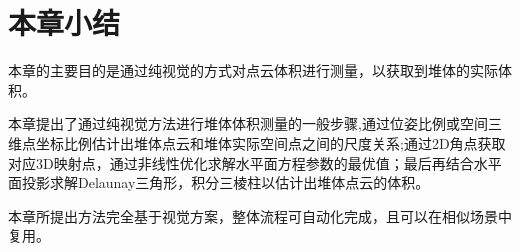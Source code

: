 \section{本章小结}
本章的主要目的是通过纯视觉的方式对点云体积进行测量，以获取到堆体的实际体积。

本章提出了通过纯视觉方法进行堆体体积测量的一般步骤,通过位姿比例或空间三维点坐标比例估计出堆体点云和堆体实际空间点之间的尺度关系;通过2D角点获取对应3D映射点，通过非线性优化求解水平面方程参数的最优值；最后再结合水平面投影求解Delaunay三角形，积分三棱柱以估计出堆体点云的体积。

本章所提出方法完全基于视觉方案，整体流程可自动化完成，且可以在相似场景中复用。





